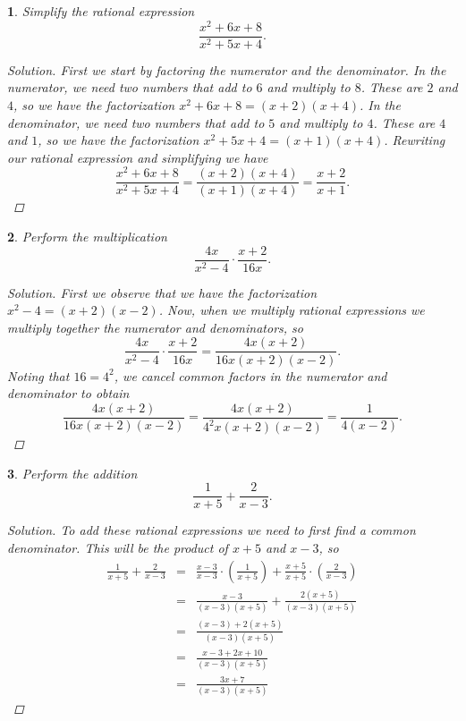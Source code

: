 \documentclass[12pt]{amsart}
\newtheorem{thm}{}
\begin{document}
\setcounter{thm}{16}
\begin{thm}
  Simplify the rational expression
  $$\frac{x^2 + 6x + 8}{x^2 + 5x + 4}.$$
  \begin{proof}[Solution]
    First we start by factoring the numerator and the denominator.
    In the numerator, we need two numbers that add to $6$ and multiply to $8$.
    These are $2$ and $4$, so we have the factorization $x^2 + 6x + 8 = (x + 2)(x + 4)$.
    In the denominator, we need two numbers that add to $5$ and multiply to $4$.
    These are $4$ and $1$, so we have the factorization $x^2 + 5x + 4 = (x + 1)(x + 4)$.
    Rewriting our rational expression and simplifying we have
    $$\frac{x^2 + 6x + 8}{x^2 + 5x + 4} = \frac{(x + 2)(x + 4)}{(x + 1)(x + 4)} = \frac{x + 2}{x + 1}.$$
  \end{proof}
\end{thm}

\setcounter{thm}{20}
\begin{thm}
  Perform the multiplication
  $$\frac{4x}{x^2 - 4} \cdot \frac{x + 2}{16x}.$$
  \begin{proof}[Solution]
    First we observe that we have the factorization $x^2 - 4 = (x + 2)(x - 2)$.
    Now, when we multiply rational expressions we multiply together the numerator and denominators, so
    $$\frac{4x}{x^2 - 4} \cdot \frac{x + 2}{16x} = \frac{4x(x+2)}{16x(x + 2)(x - 2)}.$$
    Noting that $16 = 4^2$, we cancel common factors in the numerator and denominator to obtain
    $$\frac{4x(x+2)}{16x(x + 2)(x - 2)} = \frac{4x(x+2)}{4^2x(x + 2)(x - 2)} = \frac{1}{4(x - 2)}.$$
  \end{proof}
\end{thm}

\setcounter{thm}{32}
\begin{thm}
  Perform the addition
  $$\frac{1}{x + 5} + \frac{2}{x - 3}.$$
  
  \begin{proof}[Solution]
    To add these rational expressions we need to first find a common denominator.
    This will be the product of $x + 5$ and $x - 3$, so 
    \begin{eqnarray*}
      \frac{1}{x + 5} + \frac{2}{x - 3} &=& \frac{x - 3}{x - 3} \cdot \left( \frac{1}{x + 5} \right) + \frac{x + 5}{x + 5} \cdot \left( \frac{2}{x - 3} \right)\\
      &=& \frac{x - 3}{(x -3)(x + 5)} + \frac{2(x + 5)}{(x - 3)(x + 5)}\\
      &=& \frac{(x - 3) + 2(x + 5)}{(x - 3)(x + 5)}\\
      &=& \frac{x - 3 + 2x + 10}{(x - 3)(x + 5)}\\
      &=& \frac{3x + 7}{(x - 3)( x + 5)}
    \end{eqnarray*}
    
  \end{proof}
\end{thm}
\end{document}
